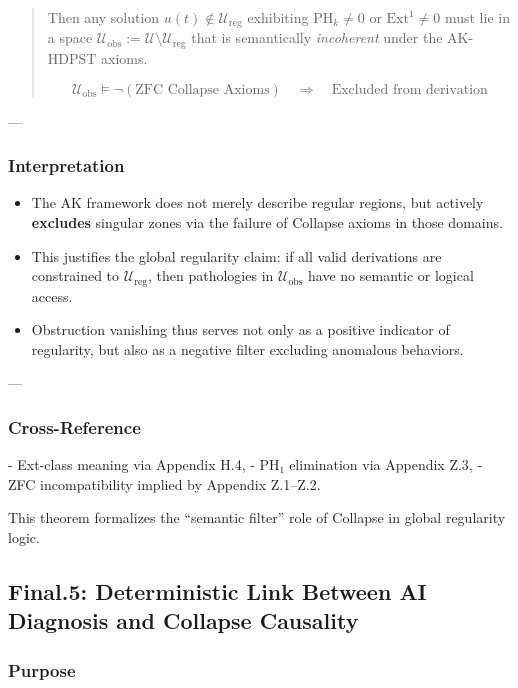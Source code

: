 \documentclass[11pt]{article}
\begin{document}
\begin{axiom}
\begin{axiom}
{{\begin{quote}
Then any solution \( u(t) \notin \mathcal{U}_{\text{reg}} \)  
exhibiting \( \mathrm{PH}_k \neq 0 \) or \( \mathrm{Ext}^1 \neq 0 \)  
must lie in a space \( \mathcal{U}_{\text{obs}} := \mathcal{U} \setminus \mathcal{U}_{\text{reg}} \)  
that is semantically \emph{incoherent} under the AK-HDPST axioms.

\[
\mathcal{U}_{\text{obs}} \models \neg (\text{ZFC Collapse Axioms}) \quad \Rightarrow \quad \text{Excluded from derivation}
\]
\end{quote}

---

\subsubsection*{Interpretation}

\begin{itemize}
  \item The AK framework does not merely describe regular regions, but actively \textbf{excludes}  
  singular zones via the failure of Collapse axioms in those domains.
  \item This justifies the global regularity claim:  
  if all valid derivations are constrained to \( \mathcal{U}_{\text{reg}} \),  
  then pathologies in \( \mathcal{U}_{\text{obs}} \) have no semantic or logical access.
  \item Obstruction vanishing thus serves not only as a positive indicator of regularity,  
  but also as a negative filter excluding anomalous behaviors.
\end{itemize}

---

\subsubsection*{Cross-Reference}

- Ext-class meaning via Appendix H.4,
- PH₁ elimination via Appendix Z.3,
- ZFC incompatibility implied by Appendix Z.1–Z.2.

This theorem formalizes the “semantic filter” role of Collapse in global regularity logic.

\subsection*{Final.5: Deterministic Link Between AI Diagnosis and Collapse Causality}

\subsubsection*{Purpose}

}}
\end{axiom}
\end{axiom}
\end{document}
